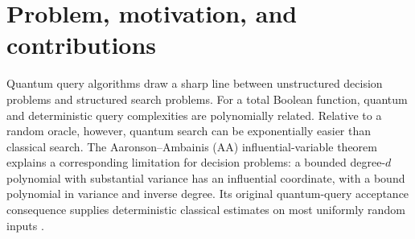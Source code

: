 \documentclass[11pt]{article}
\theoremstyle{definition}\newtheorem{definition}[theorem]{Definition}
\theoremstyle{remark}\newtheorem{remark}[theorem]{Remark}
\begin{document}
\begin{abstract}
Third, if a quantum algorithm outputs some fixed valid string with probability at least $t$, hashing its outputs into buckets and estimating bucket masses with scalar AA lets a classical algorithm with polynomially many queries find a valid string. Against a classically hard search relation, this forces high min-entropy in the accepted outputs, giving a modular alternative to the extraction of Yamakawa and Zhandry (YZ). For the unchanged YZ relation with security parameter $\lambda$, a retuned list-recovery analysis of classical soundness raises the certified min-entropy from $\Omega(\lambda^c)$ for fixed $c<1$ to $\Omega(\lambda/\log\lambda)$, for every polynomial-query prover with inverse-polynomial acceptance probability, on all but a small fraction of oracles. Separately, the honest YZ prover can run on a single parallel layer of $n_{\rm c}$ queries, one per code coordinate, instead of up to $\lambda$ rejection trials per coordinate. All bounds count queries only; computation is free.
\end{abstract}
\tableofcontents
\clearpage

\section{Problem, motivation, and contributions}\label{sec:introduction}
Quantum query algorithms draw a sharp line between unstructured decision problems and structured search problems. For a total Boolean function, quantum and deterministic query complexities are polynomially related. Relative to a random oracle, however, quantum search can be exponentially easier than classical search. The Aaronson--Ambainis (AA) influential-variable theorem explains a corresponding limitation for decision problems: a bounded degree-$d$ polynomial with substantial variance has an influential coordinate, with a bound polynomial in variance and inverse degree. Its original quantum-query acceptance consequence supplies deterministic classical estimates on most uniformly random inputs \cite{AA14,Tur26,BDST26}.
\end{document}
